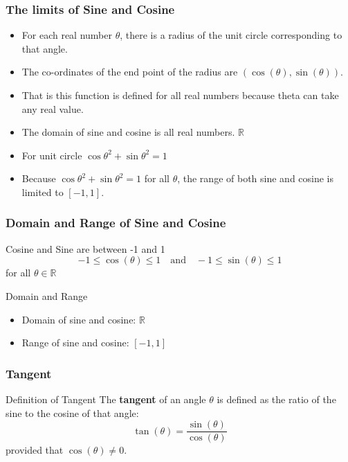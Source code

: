 \begin{frame}
    \frametitle{The limits of Sine and Cosine} 
    \begin{itemize}
        \item For each real number $\theta$, there is a radius of the unit circle corresponding to that angle.
        \item The co-ordinates of the end point of the radius are $(\cos(\theta), \sin(\theta))$.
        \item That is this function is defined for all real numbers because theta can take any real value. 
        \item The domain of sine and cosine is all real numbers. \(\mathbb{R}\) 
        \item For unit circle \( \cos \theta^{2} + \sin \theta^{2} = 1 \) 
        \item Because \( \cos \theta^{2} + \sin \theta^{2} = 1 \) for all \(\theta\), the range of both sine and cosine is limited to \([-1, 1]\).
    \end{itemize}
\end{frame}

\begin{frame}
    \frametitle{Domain and Range of Sine and Cosine}
    \begin{block}{Cosine and Sine are between -1 and 1}
        \[
        -1 \leq \cos(\theta) \leq 1 \quad \text{and} \quad -1 \leq \sin(\theta) \leq 1
        \] for all \(\theta \in \mathbb{R}\)
    \end{block}
    \begin{block}{Domain and Range}
        \begin{itemize}
            \item Domain of sine and cosine: \(\mathbb{R}\)
            \item Range of sine and cosine: \([-1, 1]\)
        \end{itemize}
    \end{block}
\end{frame}

\begin{frame}
    \frametitle{Tangent}
    \begin{block}{Definition of Tangent}
        The \textbf{tangent} of an angle $\theta$ is defined as the ratio of the sine to the cosine of that angle:
        \[\tan(\theta) = \frac{\sin(\theta)}{\cos(\theta)}\]   
        provided that \(\cos(\theta) \neq 0\).
    \end{block}
\end{frame}

